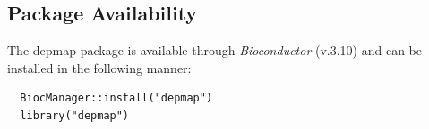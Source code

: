 \documentclass{article}
\newcommand{\hcode}[2][lgray]{{\ttfamily\color{vdgray}\colorbox{#1}{#2}}}
\begin{document}
\begin{multicols}{2}
\begin{minipage}[t]{\linewidth}
  \subsection*{Package Availability}
  \large
  The \hcode{depmap} package is available through \textit{Bioconductor} (v.3.10) and can be installed in the following manner:
  \begin{lstlisting}
  BiocManager::install("depmap")
  library("depmap")
  \end{lstlisting}
\end{minipage}

\scriptsize
 


\end{multicols}
\end{document}

